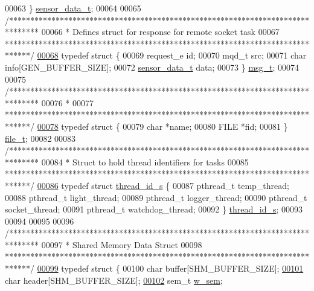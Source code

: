 \begin{DoxyCode}
00063 \} \hyperlink{structsensor__data__t}{sensor\_data\_t};
00064 
00065 \textcolor{comment}{/*******************************************************************************}
00066 \textcolor{comment}{ *  Defines struct for response for remote socket task}
00067 \textcolor{comment}{ ******************************************************************************/}
\hyperlink{structmsg__t}{00068} \textcolor{keyword}{typedef} \textcolor{keyword}{struct }\{
00069    request\_e id;
00070    mqd\_t src;
00071    \textcolor{keywordtype}{char} info[GEN\_BUFFER\_SIZE];
00072    \hyperlink{structsensor__data__t}{sensor\_data\_t} data;
00073 \} \hyperlink{structmsg__t}{msg\_t};
00074 
00075 \textcolor{comment}{/*******************************************************************************}
00076 \textcolor{comment}{ *}
00077 \textcolor{comment}{ ******************************************************************************/}
\hyperlink{structfile__t}{00078} \textcolor{keyword}{typedef} \textcolor{keyword}{struct }\{
00079    \textcolor{keywordtype}{char} *name;
00080    FILE *fid;
00081 \} \hyperlink{structfile__t}{file\_t};
00082 
00083 \textcolor{comment}{/*******************************************************************************}
00084 \textcolor{comment}{ *  Struct to hold thread identifiers for tasks}
00085 \textcolor{comment}{ ******************************************************************************/}
\hyperlink{structthread__id__s}{00086} \textcolor{keyword}{typedef} \textcolor{keyword}{struct }\hyperlink{structthread__id__s}{thread\_id\_s} \{
00087    pthread\_t temp\_thread;
00088    pthread\_t light\_thread;
00089    pthread\_t logger\_thread;
00090    pthread\_t socket\_thread;
00091    pthread\_t watchdog\_thread;
00092 \} \hyperlink{structthread__id__s}{thread\_id\_s};
00093 
00094 
00095 
00096 \textcolor{comment}{/*******************************************************************************}
00097 \textcolor{comment}{ *  Shared Memory Data Struct}
00098 \textcolor{comment}{ ******************************************************************************/}
\hyperlink{structshared__data__t}{00099} \textcolor{keyword}{typedef} \textcolor{keyword}{struct }\{
00100    \textcolor{keywordtype}{char} buffer[SHM\_BUFFER\_SIZE];  
\hyperlink{structshared__data__t_aac4f21bda7f4fc47557faac246f0b3ea}{00101}    \textcolor{keywordtype}{char} header[SHM\_BUFFER\_SIZE];  
\hyperlink{structshared__data__t_aaa7bbb7121ee6cebe671dd6e2efb7763}{00102}    sem\_t \hyperlink{structshared__data__t_aaa7bbb7121ee6cebe671dd6e2efb7763}{w\_sem};

\end{DoxyCode}
